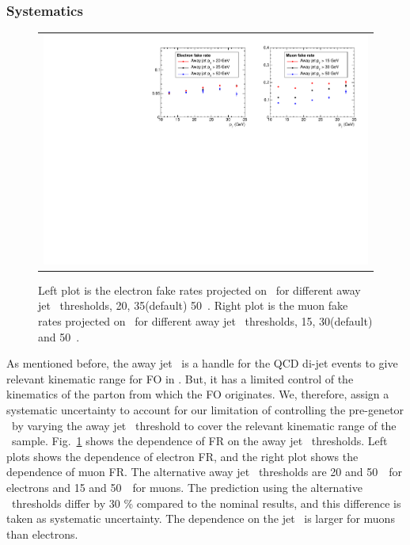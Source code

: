 \subsubsection{Systematics}
%
\begin{figure}[htp] 
\centering 
\begin{tabular}{c} 
\includegraphics[width=1.0\textwidth]{figures/FR_jetpt_variation.pdf}
\end{tabular} 
\caption{Left plot is the electron fake rates projected on \pt\ for 
different away jet \pt\ thresholds, 20, 35(default) 50~\GeV. 
Right plot is the muon fake rates projected on \pt\ for
different away jet \pt\ thresholds, 15, 30(default) and 50~\GeV.} 
\label{fig:FR_jetpt_variation} 
\end{figure} 
As mentioned before, the away jet \pt\ is a handle for the QCD di-jet events 
to give relevant kinematic range for FO in \Wjets.  
But, it has a limited control of the kinematics of the parton
from which the FO originates. 
We, therefore, assign a systematic uncertainty 
to account for our limitation of controlling the pre-genetor \pt\ 
by varying the away jet \pt\ threshold
to cover the relevant kinematic range of the \Wjets\ sample.
Fig.~\ref{fig:FR_jetpt_variation} shows the dependence of FR on the 
away jet \pt\ thresholds. Left plots shows the dependence of electron 
FR, and the right plot shows the dependence of muon FR. 
The alternative away jet \pt\ thresholds are 20 and 50~\GeV\ for electrons 
and 15 and 50~\GeV\ for muons. The prediction using the alternative \pt\ thresholds
differ by 30 \% compared to the nominal results, and this difference 
is taken as systematic uncertainty. 
The dependence on the jet \pt\ is larger for muons than electrons. 
